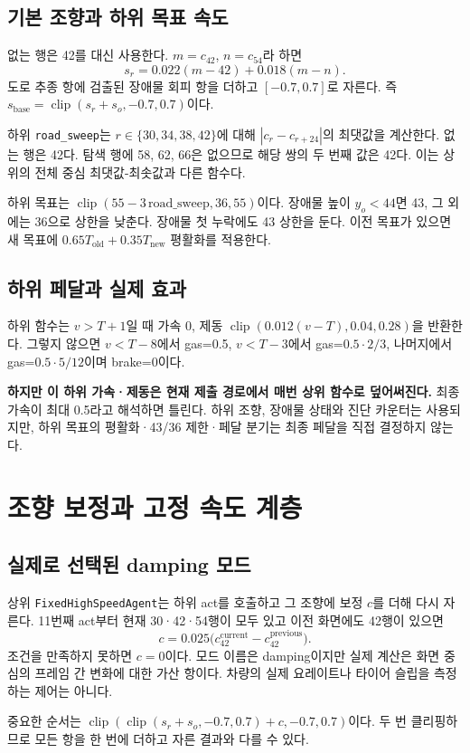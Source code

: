 \documentclass[11pt,a4paper]{article}
\newcommand{\code}[1]{{\small\nolinkurl{#1}}}
\newcommand{\clip}{\operatorname{clip}}
\begin{document}
\subsection{기본 조향과 하위 목표 속도}
없는 행은 42를 대신 사용한다. $m=c_{42}$, $n=c_{54}$라 하면
\[
 s_r=0.022(m-42)+0.018(m-n).
\]
도로 추종 항에 검출된 장애물 회피 항을 더하고 $[-0.7,0.7]$로 자른다. 즉 $s_{\mathrm{base}}=\clip(s_r+s_o,-0.7,0.7)$이다.

하위 \code{road_sweep}는 $r\in\{30,34,38,42\}$에 대해 $|c_r-c_{r+24}|$의 최댓값을 계산한다. 없는 행은 42다. 탐색 행에 58, 62, 66은 없으므로 해당 쌍의 두 번째 값은 42다. 이는 상위의 전체 중심 최댓값-최솟값과 다른 함수다.

하위 목표는 $\clip(55-3\,\mathrm{road\_sweep},36,55)$이다. 장애물 높이 $y_o<44$면 43, 그 외에는 36으로 상한을 낮춘다. 장애물 첫 누락에도 43 상한을 둔다. 이전 목표가 있으면 새 목표에 $0.65T_{\mathrm{old}}+0.35T_{\mathrm{new}}$ 평활화를 적용한다.

\subsection{하위 페달과 실제 효과}
하위 함수는 $v>T+1$일 때 가속 0, 제동 $\clip(0.012(v-T),0.04,0.28)$을 반환한다. 그렇지 않으면 $v<T-8$에서 gas=0.5, $v<T-3$에서 gas=$0.5\cdot2/3$, 나머지에서 gas=$0.5\cdot5/12$이며 brake=0이다.

\textbf{하지만 이 하위 가속·제동은 현재 제출 경로에서 매번 상위 함수로 덮어써진다.} 최종 가속이 최대 0.5라고 해석하면 틀린다. 하위 조향, 장애물 상태와 진단 카운터는 사용되지만, 하위 목표의 평활화·43/36 제한·페달 분기는 최종 페달을 직접 결정하지 않는다.

\section{조향 보정과 고정 속도 계층}
\subsection{실제로 선택된 damping 모드}
상위 \code{FixedHighSpeedAgent}는 하위 act를 호출하고 그 조향에 보정 $c$를 더해 다시 자른다. 11번째 act부터 현재 30·42·54행이 모두 있고 이전 화면에도 42행이 있으면
\[
 c=0.025\bigl(c_{42}^{\mathrm{current}}-c_{42}^{\mathrm{previous}}\bigr).
\]
조건을 만족하지 못하면 $c=0$이다. 모드 이름은 damping이지만 실제 계산은 화면 중심의 프레임 간 변화에 대한 가산 항이다. 차량의 실제 요레이트나 타이어 슬립을 측정하는 제어는 아니다.

중요한 순서는 $\clip(\clip(s_r+s_o,-0.7,0.7)+c,-0.7,0.7)$이다. 두 번 클리핑하므로 모든 항을 한 번에 더하고 자른 결과와 다를 수 있다.
\end{document}
